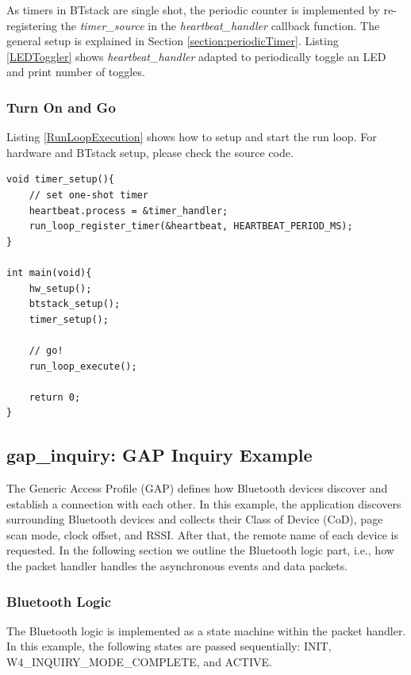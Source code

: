 \documentclass[a4paper,titlepage,oneside,12pt]{amsart} %
\begin{document}
As timers in BTstack are single shot, the periodic counter is implemented by re-registering the \emph{timer\_source} in the \emph{heartbeat\_handler} callback function. The general setup is explained in Section \ref{section:periodicTimer}. Listing \ref{LEDToggler} shows \emph{heartbeat\_handler} adapted to periodically toggle an LED and print number of toggles.


\subsubsection{Turn On and Go}

Listing \ref{RunLoopExecution} shows how to setup and start the run loop. For hardware and BTstack setup, please check the source code. 

\begin{lstlisting}[float, caption= Run loop execution., label=RunLoopExecution]
void timer_setup(){
    // set one-shot timer
    heartbeat.process = &timer_handler;
    run_loop_register_timer(&heartbeat, HEARTBEAT_PERIOD_MS);
}

int main(void){
    hw_setup();
    btstack_setup();
    timer_setup();
    
    // go!
    run_loop_execute(); 
    
    return 0;
}
\end{lstlisting}

    
\subsection{gap\_inquiry: GAP Inquiry Example}
\label{example:GapInquiry}

The Generic Access Profile (GAP) defines how Bluetooth devices discover and establish a connection with each other. In this example, the application discovers  surrounding Bluetooth devices and collects their Class of Device (CoD), page scan mode, clock offset, and RSSI. After that, the remote name of each device is requested. In the following section we outline the Bluetooth logic part, i.e., how the packet handler handles the asynchronous events and data packets.

\subsubsection{Bluetooth Logic}
The Bluetooth logic is implemented as a state machine within the packet handler. In this example, the following states are passed sequentially: INIT, W4\_INQUIRY\_MODE\_COMPLETE, and ACTIVE. 
\end{document}
